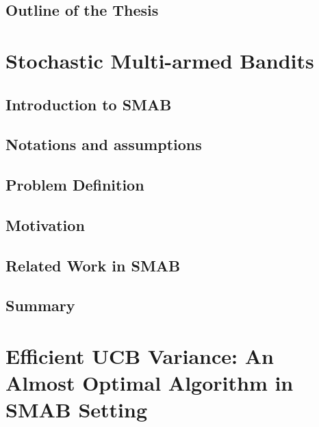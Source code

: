 \documentclass[MS,twoside]{iitmdiss}
\newcommand{\clearemptydoublepage}{\newpage{\cleardoublepage}}
\begin{document}
\section{Outline of the Thesis}
\label{outline}




\clearemptydoublepage
\chapter{Stochastic Multi-armed Bandits}
\label{chap:SMAB}

\section{Introduction to SMAB}
\label{sec:intro}


\section{Notations and assumptions}
\label{sec:notations}


\section{Problem Definition}
\label{sec:probDef}


\section{Motivation}
\label{sec:motivation}


\section{Related Work in SMAB}
\label{sec:related}


\section{Summary}
\label{chap2:conc}






\clearemptydoublepage
\chapter{Efficient UCB Variance: An Almost Optimal Algorithm in SMAB Setting}
\label{chap:EUCBV}
\end{document}
